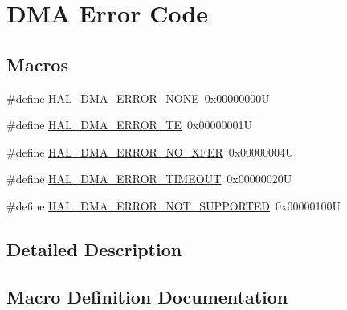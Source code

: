 \hypertarget{group___d_m_a___error___code}{}\section{D\+MA Error Code}
\label{group___d_m_a___error___code}
\subsection*{Macros}
\begin{DoxyCompactItemize}
\item 
\#define \hyperlink{group___d_m_a___error___code_gaad4009390bfbe05a1bb7115d03c25a97}{H\+A\+L\+\_\+\+D\+M\+A\+\_\+\+E\+R\+R\+O\+R\+\_\+\+N\+O\+NE}~0x00000000U
\item 
\#define \hyperlink{group___d_m_a___error___code_ga9882442c5f8f0170917934bbee1cc92d}{H\+A\+L\+\_\+\+D\+M\+A\+\_\+\+E\+R\+R\+O\+R\+\_\+\+TE}~0x00000001U
\item 
\#define \hyperlink{group___d_m_a___error___code_gab7526e686427f26bf3b6af062d5a690b}{H\+A\+L\+\_\+\+D\+M\+A\+\_\+\+E\+R\+R\+O\+R\+\_\+\+N\+O\+\_\+\+X\+F\+ER}~0x00000004U
\item 
\#define \hyperlink{group___d_m_a___error___code_ga6cf6a5b8881ff36ed4316a29bbfb5b79}{H\+A\+L\+\_\+\+D\+M\+A\+\_\+\+E\+R\+R\+O\+R\+\_\+\+T\+I\+M\+E\+O\+UT}~0x00000020U
\item 
\#define \hyperlink{group___d_m_a___error___code_ga7432f31f9972e1c0a398a3f20587d118}{H\+A\+L\+\_\+\+D\+M\+A\+\_\+\+E\+R\+R\+O\+R\+\_\+\+N\+O\+T\+\_\+\+S\+U\+P\+P\+O\+R\+T\+ED}~0x00000100U
\end{DoxyCompactItemize}


\subsection{Detailed Description}


\subsection{Macro Definition Documentation}
\mbox{\label{group___d_m_a___error___code_gab7526e686427f26bf3b6af062d5a690b}} 

